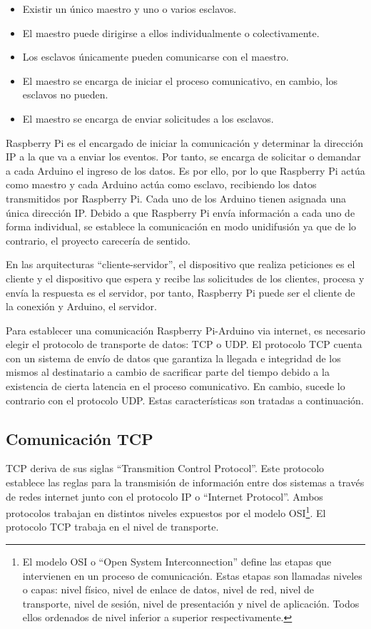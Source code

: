 \begin{itemize}
    \item Existir un único maestro y uno o varios esclavos.
    \item El maestro puede dirigirse a ellos individualmente o colectivamente.
    \item Los esclavos únicamente pueden comunicarse con el maestro.
    \item El maestro se encarga de iniciar el proceso comunicativo, en cambio, los esclavos no pueden.
    \item El maestro se encarga de enviar solicitudes a los esclavos.
\end{itemize}

Raspberry Pi es el encargado de iniciar la comunicación y determinar la dirección IP a la que va a enviar los eventos. Por tanto, se encarga de solicitar o demandar a cada Arduino el ingreso de los datos. Es por ello, por lo que Raspberry Pi actúa como maestro y cada Arduino actúa como esclavo, recibiendo los datos transmitidos por Raspberry Pi. Cada uno de los Arduino tienen asignada una única dirección IP. Debido a que Raspberry Pi envía información a cada uno de forma individual, se establece la comunicación en modo unidifusión ya que de lo contrario, el proyecto carecería de sentido.

En las arquitecturas ``cliente-servidor'', el dispositivo que realiza peticiones es el cliente y el dispositivo que espera y recibe las solicitudes de los clientes, procesa y envía la respuesta es el servidor, por tanto, Raspberry Pi puede ser el cliente de la conexión y Arduino, el servidor.

Para establecer una comunicación Raspberry Pi-Arduino via internet, es necesario elegir el protocolo de transporte de datos: TCP o UDP. El protocolo TCP cuenta con un sistema de envío de datos que garantiza la llegada e integridad de los mismos al destinatario a cambio de sacrificar parte del tiempo debido a la existencia de cierta latencia en el proceso comunicativo. En cambio, sucede lo contrario con el protocolo UDP. Estas características son tratadas a continuación.


\subsection{Comunicación TCP} \label{s2_3_2}

TCP deriva de sus siglas ``Transmition Control Protocol''. Este protocolo establece las reglas para la transmisión de información entre dos sistemas a través de redes internet junto con el protocolo IP o ``Internet Protocol''. Ambos protocolos trabajan en distintos niveles expuestos por el modelo OSI\footnote{El modelo OSI o ``Open System Interconnection'' define las etapas que intervienen en un proceso de comunicación. Estas etapas son llamadas niveles o capas: nivel físico, nivel de enlace de datos, nivel de red, nivel de transporte, nivel de sesión, nivel de presentación y nivel de aplicación. Todos ellos ordenados de nivel inferior a superior respectivamente.}. El protocolo TCP trabaja en el nivel de transporte.

